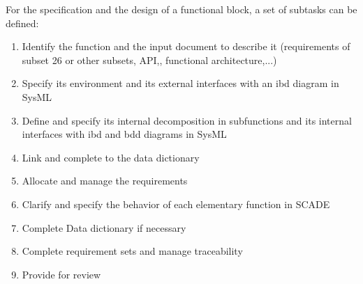 For the specification and the design of a functional block, a set of subtasks can be defined:

\begin{enumerate}
\item Identify the function and the input document to describe it (requirements of subset 26 or other subsets, API,, functional architecture,...)
\item Specify its environment and its external interfaces with an ibd diagram in SysML
\item Define and specify  its internal decomposition in subfunctions and its internal  interfaces with ibd and bdd diagrams in SysML
\item Link and complete to the data dictionary
\item Allocate and manage the requirements
\item Clarify and specify the behavior of each elementary function in SCADE
\item Complete Data dictionary if necessary
\item Complete requirement sets and manage traceability
\item Provide for review
\end{enumerate}